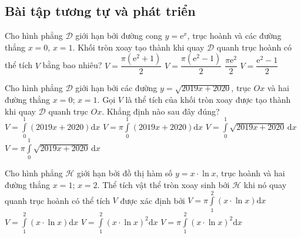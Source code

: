 \subsection{Bài tập tương tự và phát triển}
\begin{ex}%
Cho hình phẳng $\mathscr{D}$ giới hạn bởi đường cong $y=\mathrm{e}^x$, trục hoành và các đường thẳng $x=0$, $x=1$. Khối tròn xoay tạo thành khi quay $\mathscr{D}$ quanh trục hoành có thể tích $V$ bằng bao nhiêu?
\choice
{$V=\dfrac{\pi\left(\mathrm{e}^2+1\right)}{2}$}
{\True $V=\dfrac{\pi\left(\mathrm{e}^2-1\right)}{2}$}
{$\dfrac{\pi{\mathrm{e}^2}}{2}$}
{$V=\dfrac{\mathrm{e}^2-1}{2}$}
\end{ex}

\begin{ex}%
Cho hình phẳng $\mathscr{D}$ giới hạn bởi các đường $y=\sqrt{2019x+2020}$, trục $Ox$ và hai đường thẳng $x=0$; $x=1$. Gọi  $V$ là thể tích của khối tròn xoay được tạo thành khi quay $\mathscr{D}$ quanh trục $Ox$. Khẳng định nào sau đây đúng?
\choice
{$V=\displaystyle\int\limits_0^1\left(2019x+2020\right){\mathrm{d}}x$}
{\True $V=\pi\displaystyle\int\limits_0^1\left(2019x+2020\right){\mathrm{d}}x$}
{$V=\displaystyle\int\limits_0^1\sqrt{2019x+2020}\,\mathrm{d}x$}
{$V=\pi\displaystyle\int\limits_0^1\sqrt{2019x+2020}\,\mathrm{d}x$}
\end{ex}

\begin{ex}%
Cho hình phẳng $\mathscr{H}$ giới hạn bởi đồ thị hàm số $y=x\cdot\ln x$, trục hoành và hai đường thẳng $x=1$; $x=2$. Thể tích vật thể tròn xoay sinh bới $\mathscr{H}$ khi nó quay quanh trục hoành có thể tích $V$ được xác định bởi
\choice
{$V=\pi\displaystyle\int\limits_1^2\left(x\cdot\ln x\right){\mathrm{d}}x$}
{$V=\displaystyle\int\limits_1^2\left(x\cdot\ln x\right){\mathrm{d}}x$}
{$V=\displaystyle\int\limits_1^2\left(x\cdot\ln x\right)^2\mathrm{d}x$}
{\True $V=\pi\displaystyle\int\limits_1^2\left(x\cdot\ln x\right)^2\mathrm{d}x$}
\end{ex}

